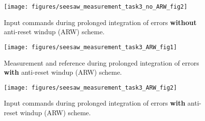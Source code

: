 \documentclass[12pt,a4paper,twocolumn]{article}
\begin{document}
\begin{figure}[ht]
\centering
\texttt{[image: figures/seesaw\_measurement\_task3\_no\_ARW\_fig2]}
\caption[Measure1]{\label{f:measure1} Input commands during prolonged integration of errors \textbf{without} anti-reset windup (ARW) scheme.}
\label{fig:seesaw_measurement_task3_no_ARW_fig2}
\end{figure}

\begin{figure}[ht]
\centering
\texttt{[image: figures/seesaw\_measurement\_task3\_ARW\_fig1]}
\caption[Measure1]{\label{f:measure1} Measurement and reference during prolonged integration of errors \textbf{with} anti-reset windup (ARW) scheme.}
\label{fig:seesaw_measurement_task3_ARW_fig1}
\end{figure}

\begin{figure}[ht]
\centering
\texttt{[image: figures/seesaw\_measurement\_task3\_ARW\_fig2]}
\caption[Measure1]{\label{f:measure1} Input commands during prolonged integration of errors \textbf{with} anti-reset windup (ARW) scheme.}
\label{fig:seesaw_measurement_task3_ARW_fig2}
\end{figure}
\end{document}
